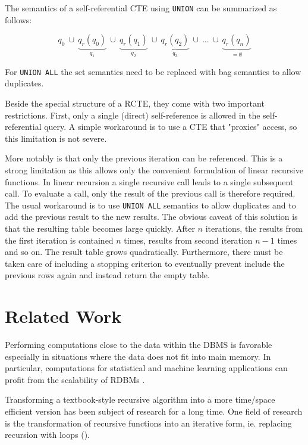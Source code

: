 The semantics of a self-referential CTE using \texttt{UNION} can be summarized as follows:

$$
q_0 ~\cup ~\underbrace{q_r(q_0)}_{q_1} ~\cup~ \underbrace{q_r(q_1)}_{q_2}~ \cup~\underbrace{q_r(q_2)}_{q_3}~ \cup ~\hdots ~ \cup ~ \underbrace{q_r(q_n)}_{= \emptyset}
$$

For \texttt{UNION ALL} the set semantics need to be replaced with bag semantics to allow duplicates.

Beside the special structure of a RCTE, they come with two important restrictions. First, only a single (direct) self-reference is allowed in the self-referential query. A simple workaround is to use a CTE that "proxies" access, so this limitation is not severe.

More notably is that only the previous iteration can be referenced. This is a strong limitation as this allows only the convenient formulation of linear recursive functions. In linear recursion a single recursive call leads to a single subsequent call. To evaluate a call, only the result of the previous call is therefore required. The usual workaround is to use \texttt{UNION ALL} semantics to allow duplicates and to add the previous result to the new results. The obvious caveat of this solution is that the resulting table becomes large quickly. After $n$ iterations, the results from the first iteration is contained $n$ times, results from second iteration $n-1$ times and so on. The result table grows quadratically. Furthermore, there must be taken care of including a stopping criterion to eventually prevent include the previous rows again and instead return the empty table.


\section{Related Work}

Performing computations close to the data within the DBMS is favorable especially in situations where the data does not fit into main memory. In particular, computations for statistical and machine learning applications can profit from the scalability of RDBMs \cite{SQLforML,PCAinSQL,MLwithUDFs,MLinSQL2}.

Transforming a textbook-style recursive algorithm into a more time/space efficient version has been subject of research for a long time. One field of research is the transformation of recursive functions into an iterative form, ie. replacing recursion with loops (\cite{unrollingRCTEs}).

